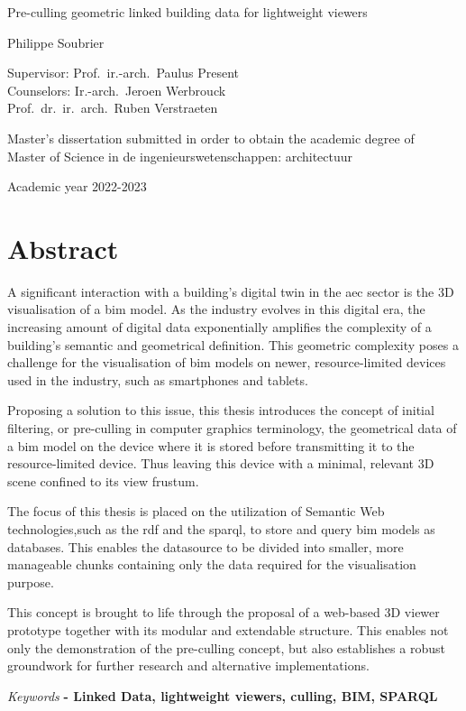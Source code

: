 \begin{center}
    \sffamily
    \huge Pre-culling geometric linked building data
    for lightweight viewers

    \Large Philippe Soubrier

    \normalsize
    Supervisor: Prof.\ ir.-arch.\ Paulus Present         \\
    Counselors: Ir.-arch.\ Jeroen Werbrouck \\
    Prof.\ dr.\ ir.\ arch.\ Ruben Verstraeten
\end{center}

Master’s dissertation submitted in order to obtain the academic degree of \\
Master of Science in de ingenieurswetenschappen: architectuur

Academic year 2022-2023
\section*{\LARGE Abstract}
A significant interaction with a building's digital twin in the \ac{aec} sector is the 3D visualisation of a \ac{bim} model. As the industry evolves in this digital era, the increasing amount of digital data exponentially amplifies the complexity of a building's semantic and geometrical definition. This geometric complexity poses a challenge for the visualisation of \ac{bim} models on newer, resource-limited devices used in the industry, such as smartphones and tablets.

Proposing a solution to this issue, this thesis introduces the concept of initial filtering, or pre-culling in computer graphics terminology, the geometrical data of a \ac{bim} model on the device where it is stored before transmitting it to the resource-limited device. Thus leaving this device with a minimal, relevant 3D scene confined to its view frustum.

The focus of this thesis is placed on the utilization of Semantic Web technologies,such as the \ac{rdf} and the \ac{sparql}, to store and query \ac{bim} models as databases. This enables the datasource to be divided into smaller, more manageable chunks containing only the data required for the visualisation purpose.

This concept is brought to life through the proposal of a web-based 3D viewer prototype together with its modular and extendable structure. This enables not only the demonstration of the pre-culling concept, but also establishes a robust groundwork for further research and alternative implementations.
                   
\vfill
\emph{Keywords} \textbf{
    - Linked Data, lightweight viewers, culling, BIM, SPARQL
}
